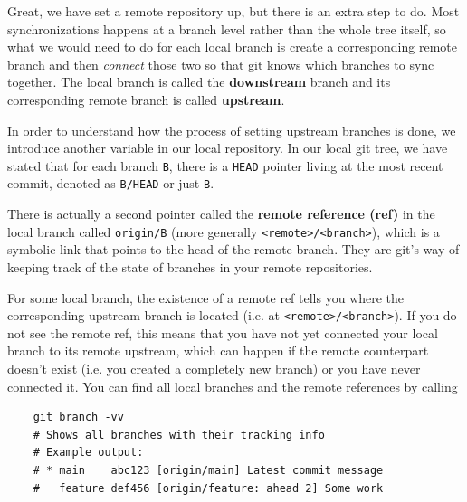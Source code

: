   Great, we have set a remote repository up, but there is an extra step to do. Most synchronizations happens at a branch level rather than the whole tree itself, so what we would need to do for each local branch is create a corresponding remote branch and then \textit{connect} those two so that git knows which branches to sync together. The local branch is called the \textbf{downstream} branch and its corresponding remote branch is called \textbf{upstream}. 

  In order to understand how the process of setting upstream branches is done, we introduce another variable in our local repository. In our local git tree, we have stated that for each branch \texttt{B}, there is a \texttt{HEAD} pointer living at the most recent commit, denoted as \texttt{B/HEAD} or just \texttt{B}. 

  \begin{definition} 
    There is actually a second pointer called the \textbf{remote reference (ref)} in the local branch called \texttt{origin/B} (more generally \texttt{<remote>/<branch>}), which is a symbolic link that points to the head of the remote branch. They are git's way of keeping track of the state of branches in your remote repositories. 
  \end{definition} 

  For some local branch, the existence of a remote ref tells you where the corresponding upstream branch is located (i.e. at \texttt{<remote>/<branch>}). If you do not see the remote ref, this means that you have not yet connected your local branch to its remote upstream, which can happen if the remote counterpart doesn't exist (i.e. you created a completely new branch) or you have never connected it. You can find all local branches and the remote references by calling 
  \begin{lstlisting}
    git branch -vv
    # Shows all branches with their tracking info
    # Example output:
    # * main    abc123 [origin/main] Latest commit message
    #   feature def456 [origin/feature: ahead 2] Some work
  \end{lstlisting} 

